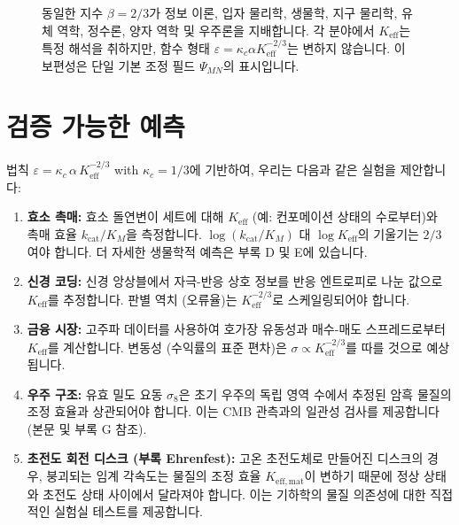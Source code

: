 \documentclass[11pt,a4paper]{article}
\newcommand{\Keff}{K_{\mathrm{eff}}}
\newcommand{\eps}{\varepsilon}
\newcommand{\kappac}{\kappa_c}
\begin{document}
\begin{figure}[H]
		\caption{동일한 지수 \(\beta = 2/3\)가 정보 이론, 입자 물리학, 생물학, 지구 물리학, 유체 역학, 정수론, 양자 역학 및 우주론을 지배합니다. 각 분야에서 \(\Keff\)는 특정 해석을 취하지만, 함수 형태 \(\varepsilon = \kappa_c \alpha K_{\mathrm{eff}}^{-2/3}\)는 변하지 않습니다. 이 보편성은 단일 기본 조정 필드 \(\Psi_{MN}\)의 표시입니다.}
		\label{fig:unified-beta}
	\end{figure}
	
	\section{검증 가능한 예측}
	\label{sec:predictions}
	
	법칙 \(\eps = \kappac\,\alpha\,\Keff^{-2/3}\) with \(\kappac = 1/3\)에 기반하여, 우리는 다음과 같은 실험을 제안합니다:
	
	\begin{enumerate}
		\item \textbf{효소 촉매:} 효소 돌연변이 세트에 대해 \(\Keff\) (예: 컨포메이션 상태의 수로부터)와 촉매 효율 \(k_{\text{cat}}/K_M\)을 측정합니다. \(\log(k_{\text{cat}}/K_M)\) 대 \(\log \Keff\)의 기울기는 \(2/3\)여야 합니다. 더 자세한 생물학적 예측은 부록 D 및 E에 있습니다.
		\item \textbf{신경 코딩:} 신경 앙상블에서 자극-반응 상호 정보를 반응 엔트로피로 나눈 값으로 \(\Keff\)를 추정합니다. 판별 역치 (오류율)는 \(\Keff^{-2/3}\)로 스케일링되어야 합니다.
		\item \textbf{금융 시장:} 고주파 데이터를 사용하여 호가장 유동성과 매수-매도 스프레드로부터 \(\Keff\)를 계산합니다. 변동성 (수익률의 표준 편차)은 \(\sigma \propto \Keff^{-2/3}\)를 따를 것으로 예상됩니다.
		\item \textbf{우주 구조:} 유효 밀도 요동 \(\sigma_8\)은 초기 우주의 독립 영역 수에서 추정된 암흑 물질의 조정 효율과 상관되어야 합니다. 이는 CMB 관측과의 일관성 검사를 제공합니다 (본문 및 부록 G 참조).
		\item \textbf{초전도 회전 디스크 (부록 Ehrenfest):} 고온 초전도체로 만들어진 디스크의 경우, 붕괴되는 임계 각속도는 물질의 조정 효율 \(K_{\mathrm{eff,mat}}\)이 변하기 때문에 정상 상태와 초전도 상태 사이에서 달라져야 합니다. 이는 기하학의 물질 의존성에 대한 직접적인 실험실 테스트를 제공합니다.
	\end{enumerate}
	
\end{document}
